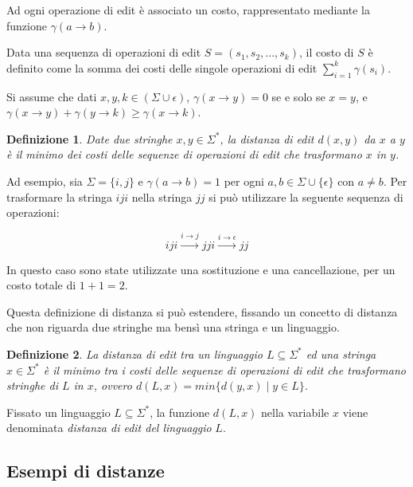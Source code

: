 \documentclass[a4paper,12pt]{report}
\newtheorem{definition}{Definizione}[chapter]
\begin{document}
    Ad ogni operazione di edit è associato un costo, rappresentato mediante la funzione $\gamma(a \rightarrow b)$.
    
    Data una sequenza di operazioni di edit $S = (s_1, s_2, ..., s_k)$, il costo di $S$ è definito come la somma dei costi delle singole operazioni di edit
    $\sum_{i=1}^{k} \gamma(s_i)$.

    Si assume che dati $x, y, k \in (\Sigma \cup \epsilon)$, $\gamma(x \rightarrow y) = 0$ se e solo se $x = y$, e $\gamma(x \rightarrow y)
    + \gamma(y \rightarrow k) \geq \gamma(x \rightarrow k)$.

    \begin{definition}
        Date due stringhe $x, y \in \Sigma^*$, la distanza di edit $d(x, y)$ da $x$ a $y$ è il minimo dei costi delle sequenze di operazioni di edit che trasformano $x$ in $y$.
    \end{definition}
    
    Ad esempio, sia $\Sigma = \{i, j\}$ e $\gamma(a \rightarrow b) = 1$ per ogni $a, b \in \Sigma \cup \{\epsilon\}$ con $a \neq b$. Per trasformare la stringa $iji$ nella stringa $jj$ si può utilizzare la seguente sequenza di operazioni:
    
    $$iji \xrightarrow{i \rightarrow j} jji \xrightarrow{i \rightarrow \epsilon} jj$$
    
    In questo caso sono state utilizzate una sostituzione e una cancellazione, per un costo totale di $1 + 1 = 2$.

    Questa definizione di distanza si può estendere, fissando un concetto di distanza che non riguarda due stringhe ma bensì una stringa e un linguaggio.

    \begin{definition}
        La distanza di edit tra un linguaggio $L \subseteq \Sigma^*$ ed una stringa $x \in \Sigma^*$ è il minimo tra i costi delle sequenze di operazioni di edit
        che trasformano stringhe di $L$ in $x$, ovvero $d(L, x) = min\{d(y, x) \mid y \in L \}$.
    \end{definition}

    Fissato un linguaggio $L \subseteq \Sigma^*$, la funzione $d(L, x)$ nella variabile $x$ viene denominata \textit{distanza di edit del linguaggio} $L$.

    \subsection{Esempi di distanze}
    
\end{document}
